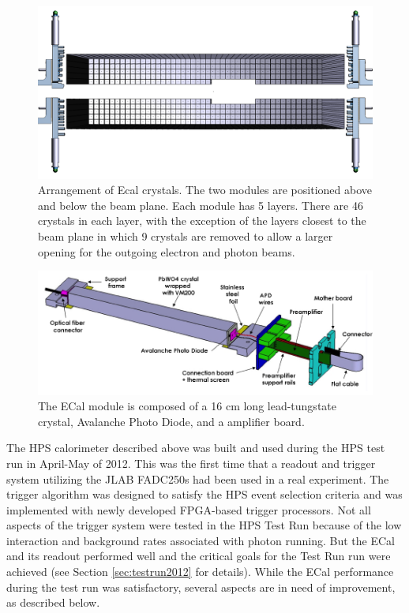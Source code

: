 \begin{figure}[t]
\includegraphics[width=\textwidth]{ecal/ECal.png}
\caption{\small{Arrangement of Ecal crystals. The two modules are positioned above and below the beam plane. Each module has 5 layers. 
There are 46 crystals in each layer, with the exception of the layers closest to the beam plane in which 9 crystals are removed to allow 
a larger opening for the outgoing electron and photon beams.}}\label{fig:ecal}
\end{figure}

\begin{figure}[t]
\includegraphics[width=\textwidth]{ecal/ecal_module.png}
\caption{\small{The ECal module is composed of a 16 cm long lead-tungstate crystal, Avalanche Photo Diode, and a amplifier 
board.}}\label{fig:module}
\end{figure}

The HPS calorimeter described above was built and used during the HPS test run in April-May of 2012. This was the first time that 
a readout and trigger system utilizing the JLAB FADC250s had been used in a real experiment. The trigger algorithm was designed 
to satisfy the HPS 
event selection criteria and was implemented with newly developed FPGA-based trigger processors. Not all aspects 
of the trigger system were tested in the HPS Test Run because of the low interaction and background rates associated with photon running. But the 
ECal and its readout performed well and the critical goals for the Test Run run were 
achieved (see Section \ref{sec:testrun2012} for details). While the ECal performance during the test run was satisfactory, several aspects are in need of improvement, as described below.   

